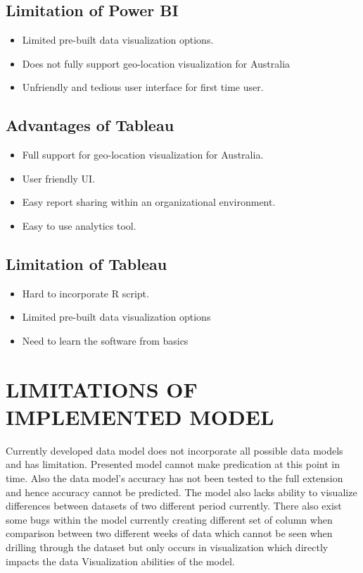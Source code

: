 \documentclass{article}
\begin{document}
\subsection{Limitation of Power BI }\label{Limitation}
\begin{itemize}
\item Limited pre-built data visualization options.
\item Does not fully support geo-location visualization for Australia
\item Unfriendly and tedious user interface for first time user.
\end{itemize}
\subsection{Advantages of Tableau }\label{advantages}
\begin{itemize}
\item Full support for geo-location visualization for Australia.
\item User friendly UI.
\item Easy report sharing within an organizational environment. 
\item Easy to use analytics tool.
\end{itemize}
\subsection{Limitation of Tableau }\label{Limitation}
\begin{itemize}
\item Hard to incorporate R script.
\item Limited pre-built data visualization options
\item Need to learn the software from basics
\end{itemize}
\section{LIMITATIONS OF IMPLEMENTED MODEL }\label{sec:Limitation of model}
Currently developed data model does not incorporate all possible data models and has limitation. Presented model cannot make predication at this point in time. Also the data model’s accuracy has not been tested to the full extension and hence accuracy cannot be predicted. The model also lacks ability to visualize differences between datasets of two different period currently. There also exist some bugs within the model currently creating different set of column when comparison between two different weeks of data which cannot be seen when drilling through the dataset but only occurs in visualization which directly impacts the data Visualization abilities of the model. \\
\end{document}

